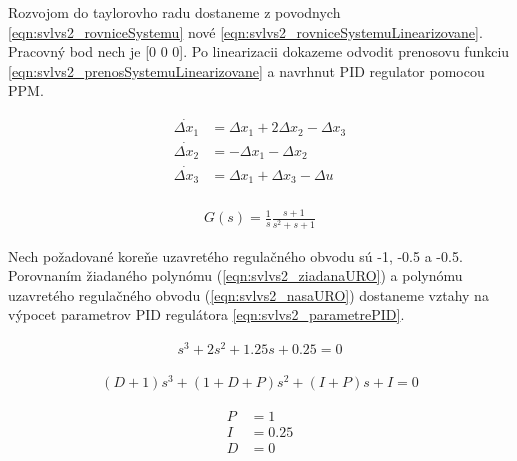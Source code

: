 \documentclass[../main.tex]{subfiles}
\begin{document}
Rozvojom do taylorovho radu dostaneme z povodnych \cref{eqn:svlvs2_rovniceSystemu} nové \cref{eqn:svlvs2_rovniceSystemuLinearizovane}. Pracovný bod nech je [0 0 0]. Po linearizacii dokazeme odvodit prenosovu funkciu \cref{eqn:svlvs2_prenosSystemuLinearizovane} a navrhnut PID regulator pomocou PPM.

\begin{equation}
		\begin{aligned}
		\dot{\Delta x_1} &= \Delta x_1 + 2\Delta x_2 - \Delta x_3 			\\	
		\dot{\Delta x_2} &= - \Delta x_1 - \Delta x_2 					\\
		\dot{\Delta x_3} &=  \Delta x_1 + \Delta x_3 - \Delta u 				\\
		\end{aligned}
		\label{eqn:svlvs2_rovniceSystemuLinearizovane}
	\end{equation}

\begin{equation}
		\begin{aligned}
		G(s) = \frac{1}{s}\frac{s+1}{s^2+s+1}
		\end{aligned}
		\label{eqn:svlvs2_prenosSystemuLinearizovane}
	\end{equation}

Nech požadované koreňe uzavretého regulačného obvodu sú -1, -0.5 a -0.5. Porovnaním žiadaného polynómu (\cref{eqn:svlvs2_ziadanaURO}) a polynómu uzavretého regulačného obvodu (\cref{eqn:svlvs2_nasaURO}) dostaneme vztahy na výpocet parametrov PID regulátora \cref{eqn:svlvs2_parametrePID}.

\begin{equation}
		\begin{aligned}
		s^3+2s^2+1.25s+0.25=0
		\end{aligned}
		\label{eqn:svlvs2_ziadanaURO}
	\end{equation}

\begin{equation}
		\begin{aligned}
		(D+1)s^3+(1+D+P)s^2+(I+P)s+I=0
		\end{aligned}
		\label{eqn:svlvs2_nasaURO}
	\end{equation}

\begin{equation}
		\begin{aligned}
		P &= 1 						\\
		I &= 0.25 						\\
		D &= 0						 \\
		\end{aligned}
		\label{eqn:svlvs2_parametrePID}
	\end{equation}
\end{document}
